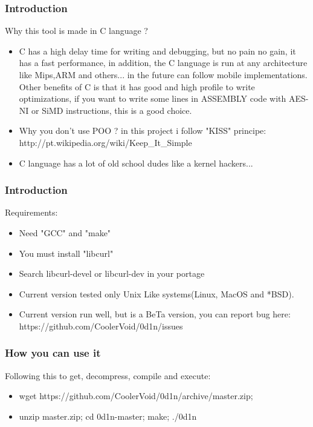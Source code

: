 \documentclass[serif,mathserif]{beamer}
\begin{document}
\begin{frame}
  \frametitle{Introduction}
  Why this tool is made in C language ?
  \begin{itemize}
  \item  C has a high delay time for writing and debugging, but no pain no gain, it has a fast performance, in addition, the C language is run at any architecture like Mips,ARM and others... in the future can follow mobile implementations. Other benefits of C  is that it has good and high profile to write optimizations, if you want to write some lines in ASSEMBLY code with AES-NI or SiMD instructions, this is a good choice. 
  \item  Why you don't use POO ? in this project i follow "KISS" principe: http://pt.wikipedia.org/wiki/Keep\_It\_Simple
  \item  C language has a lot of old school dudes like a kernel hackers... 
  \end{itemize}
\end{frame}



\begin{frame}
  \frametitle{Introduction}
  Requirements:
  \begin{itemize}
  \item  Need "GCC" and "make" 
  \item  You must install "libcurl" 
  \item  Search libcurl-devel or libcurl-dev in your portage
  \item  Current version tested only Unix Like systems(Linux, MacOS and *BSD).
  \item  Current version run well, but is a BeTa version, you can report bug here: https://github.com/CoolerVoid/0d1n/issues 
  \end{itemize}
\end{frame}


\begin{frame}
  \frametitle{How you can use it}
  Following this to get, decompress, compile and execute:
  \begin{itemize}
  \item wget https://github.com/CoolerVoid/0d1n/archive/master.zip; 
  \item unzip master.zip; cd 0d1n-master; make; ./0d1n
  \end{itemize}
\end{frame}
\end{document}
